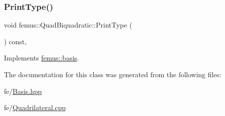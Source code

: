 \subsubsection{\texorpdfstring{Print\+Type()}{PrintType()}}
{\footnotesize\ttfamily void femus\+::\+Quad\+Biquadratic\+::\+Print\+Type (\begin{DoxyParamCaption}{ }\end{DoxyParamCaption}) const\hspace{0.3cm}{\ttfamily [inline]}, {\ttfamily [virtual]}}



Implements \mbox{\hyperlink{classfemus_1_1basis_abbae7bf8f31ec5793c911bc6d4ea0572}{femus\+::basis}}.



The documentation for this class was generated from the following files\+:\begin{DoxyCompactItemize}
\item 
fe/\mbox{\hyperlink{_basis_8hpp}{Basis.\+hpp}}\item 
fe/\mbox{\hyperlink{_quadrilateral_8cpp}{Quadrilateral.\+cpp}}\end{DoxyCompactItemize}
